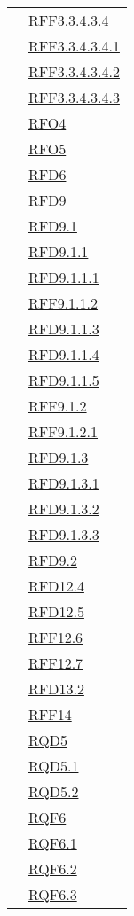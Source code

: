 \begin{longtable}{|>{\centering}m{5cm}|m{5cm}<{\centering}|}
& \hyperlink{RFF3.3.4.3.4}{RFF3.3.4.3.4}\\
& \hyperlink{RFF3.3.4.3.4.1}{RFF3.3.4.3.4.1}\\
& \hyperlink{RFF3.3.4.3.4.2}{RFF3.3.4.3.4.2}\\
& \hyperlink{RFF3.3.4.3.4.3}{RFF3.3.4.3.4.3}\\
& \hyperlink{RFO4}{RFO4}\\
& \hyperlink{RFO5}{RFO5}\\
& \hyperlink{RFD6}{RFD6}\\
& \hyperlink{RFD9}{RFD9}\\
& \hyperlink{RFD9.1}{RFD9.1}\\
& \hyperlink{RFD9.1.1}{RFD9.1.1}\\
& \hyperlink{RFD9.1.1.1}{RFD9.1.1.1}\\
& \hyperlink{RFF9.1.1.2}{RFF9.1.1.2}\\
& \hyperlink{RFD9.1.1.3}{RFD9.1.1.3}\\
& \hyperlink{RFD9.1.1.4}{RFD9.1.1.4}\\
& \hyperlink{RFD9.1.1.5}{RFD9.1.1.5}\\
& \hyperlink{RFF9.1.2}{RFF9.1.2}\\
& \hyperlink{RFF9.1.2.1}{RFF9.1.2.1}\\
& \hyperlink{RFD9.1.3}{RFD9.1.3}\\
& \hyperlink{RFD9.1.3.1}{RFD9.1.3.1}\\
& \hyperlink{RFD9.1.3.2}{RFD9.1.3.2}\\
& \hyperlink{RFD9.1.3.3}{RFD9.1.3.3}\\
& \hyperlink{RFD9.2}{RFD9.2}\\
& \hyperlink{RFD12.4}{RFD12.4}\\
& \hyperlink{RFD12.5}{RFD12.5}\\
& \hyperlink{RFF12.6}{RFF12.6}\\
& \hyperlink{RFF12.7}{RFF12.7}\\
& \hyperlink{RFD13.2}{RFD13.2}\\
& \hyperlink{RFF14}{RFF14}\\
& \hyperlink{RQD5}{RQD5}\\
& \hyperlink{RQD5.1}{RQD5.1}\\
& \hyperlink{RQD5.2}{RQD5.2}\\
& \hyperlink{RQF6}{RQF6}\\
& \hyperlink{RQF6.1}{RQF6.1}\\
& \hyperlink{RQF6.2}{RQF6.2}\\
& \hyperlink{RQF6.3}{RQF6.3}\\

\end{longtable}
